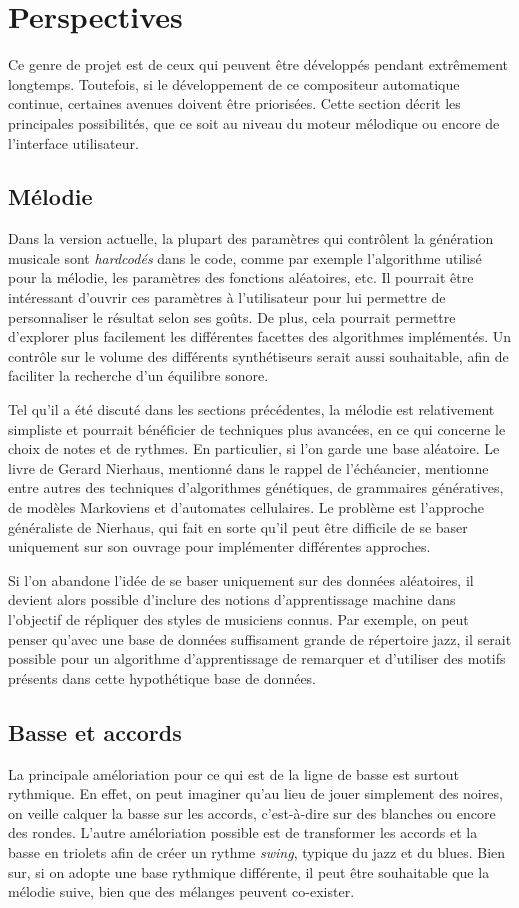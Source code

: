 \documentclass[letterpaper,12pt]{scrartcl}
\begin{document}
	\section{Perspectives}
	
	Ce genre de projet est de ceux qui peuvent être développés pendant extrêmement longtemps. Toutefois, si le développement de ce compositeur automatique continue, certaines avenues doivent être priorisées. Cette section décrit les principales possibilités, que ce soit au niveau du moteur mélodique ou encore de l'interface utilisateur.
	
		\subsection{Mélodie}
		Dans la version actuelle, la plupart des paramètres qui contrôlent la génération musicale sont \textit{hardcodés} dans le code, comme par exemple l'algorithme utilisé pour la mélodie, les paramètres des fonctions aléatoires, etc. Il pourrait être intéressant d'ouvrir ces paramètres à l'utilisateur pour lui permettre de personnaliser le résultat selon ses goûts. De plus, cela pourrait permettre d'explorer plus facilement les différentes facettes des algorithmes implémentés. Un contrôle sur le volume des différents synthétiseurs serait aussi souhaitable, afin de faciliter la recherche d'un équilibre sonore.
		
		Tel qu'il a été discuté dans les sections précédentes, la mélodie est relativement simpliste et pourrait bénéficier de techniques plus avancées, en ce qui concerne le choix de notes et de rythmes. En particulier, si l'on garde une base aléatoire. Le livre de Gerard Nierhaus\cite{nierhaus}, mentionné dans le rappel de l'échéancier, mentionne entre autres des techniques d'algorithmes génétiques, de grammaires génératives, de modèles Markoviens et d'automates cellulaires. Le problème est l'approche généraliste de Nierhaus, qui fait en sorte qu'il peut être difficile de se baser uniquement sur son ouvrage pour implémenter différentes approches.
		
		Si l'on abandone l'idée de se baser uniquement sur des données aléatoires, il devient alors possible d'inclure des notions d'apprentissage machine dans l'objectif de répliquer des styles de musiciens connus. Par exemple, on peut penser qu'avec une base de données suffisament grande de répertoire jazz, il serait possible pour un algorithme d'apprentissage de remarquer et d'utiliser des motifs présents dans cette hypothétique base de données.
		\subsection{Basse et accords}
		La principale améloriation pour ce qui est de la ligne de basse est surtout rythmique. En effet, on peut imaginer qu'au lieu de jouer simplement des noires, on veille calquer la basse sur les accords, c'est-à-dire sur des blanches ou encore des rondes. L'autre améloriation possible est de transformer les accords et la basse en triolets afin de créer un rythme \textit{swing}, typique du jazz et du blues. Bien sur, si on adopte une base rythmique différente, il peut être souhaitable que la mélodie suive, bien que des mélanges peuvent co-exister.
\end{document}

